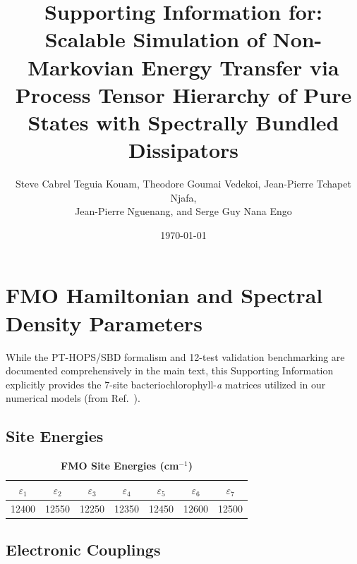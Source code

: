 \documentclass[11pt,a4paper]{article}
\begin{document}
\title{\textbf{Supporting Information for:\\Scalable Simulation of Non-Markovian Energy Transfer via Process Tensor Hierarchy of Pure States with Spectrally Bundled Dissipators}}

\author{Steve Cabrel Teguia Kouam, Theodore Goumai Vedekoi, Jean-Pierre Tchapet Njafa,\\ Jean-Pierre Nguenang, and Serge Guy Nana Engo}

\date{\today}
\maketitle

\section{FMO Hamiltonian and Spectral Density Parameters}

While the PT-HOPS/SBD formalism and 12-test validation benchmarking are documented comprehensively in the main text, this Supporting Information explicitly provides the 7-site bacteriochlorophyll-\textit{a} matrices utilized in our numerical models (from Ref.\ \cite{Adolphs2006}).

\subsection{Site Energies}

\begin{table}[h]
\centering
\caption{\textbf{FMO Site Energies (cm$^{-1}$)}}
\label{tab:SI_site_energies}
\begin{tabular}{ccccccc}
\toprule
$\varepsilon_1$ & $\varepsilon_2$ & $\varepsilon_3$ & $\varepsilon_4$ & $\varepsilon_5$ & $\varepsilon_6$ & $\varepsilon_7$ \\
\midrule
12400 & 12550 & 12250 & 12350 & 12450 & 12600 & 12500 \\
\bottomrule
\end{tabular}
\end{table}

\subsection{Electronic Couplings}
\end{document}
